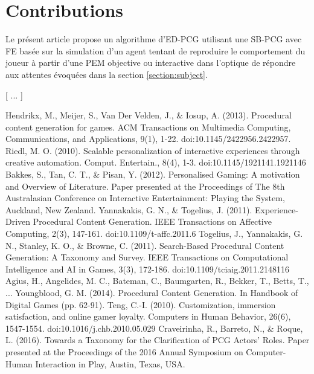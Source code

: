 \documentclass[a4paper,11pt]{article}
\begin{document}
    \section{Contributions}\label{section:contributions}
      
      Le présent article propose un algorithme d'ED-PCG utilisant une SB-PCG avec FE basée sur la simulation d'un agent tentant de reproduire le comportement du joueur à partir d'une PEM objective ou interactive dans l'optique de répondre aux attentes évoquées dans la section \ref{section:subject}.
      
      \vspace{2em}
      \centerline{[ ... ]}

    \begin{thebibliography}{99}
        Hendrikx, M., Meijer, S., Van Der Velden, J., \& Iosup, A. (2013). Procedural content generation for games. ACM Transactions on Multimedia Computing, Communications, and Applications, 9(1), 1-22. doi:10.1145/2422956.2422957.
        Riedl, M. O. (2010). Scalable personalization of interactive experiences through creative automation. Comput. Entertain., 8(4), 1-3. doi:10.1145/1921141.1921146
        Bakkes, S., Tan, C. T., \& Pisan, Y. (2012). Personalised Gaming: A motivation and Overview of Literature. Paper presented at the Proceedings of The 8th Australasian Conference on Interactive Entertainment: Playing the System, Auckland, New Zealand. 
        Yannakakis, G. N., \& Togelius, J. (2011). Experience-Driven Procedural Content Generation. IEEE Transactions on Affective Computing, 2(3), 147-161. doi:10.1109/t-affc.2011.6
        Togelius, J., Yannakakis, G. N., Stanley, K. O., \& Browne, C. (2011). Search-Based Procedural Content Generation: A Taxonomy and Survey. IEEE Transactions on Computational Intelligence and AI in Games, 3(3), 172-186. doi:10.1109/tciaig.2011.2148116     
        Agius, H., Angelides, M. C., Bateman, C., Baumgarten, R., Bekker, T., Betts, T., ... Youngblood, G. M. (2014). Procedural Content Generation. In Handbook of Digital Games (pp. 62-91). 
        Teng, C.-I. (2010). Customization, immersion satisfaction, and online gamer loyalty. Computers in Human Behavior, 26(6), 1547-1554. doi:10.1016/j.chb.2010.05.029
        Craveirinha, R., Barreto, N., \& Roque, L. (2016). Towards a Taxonomy for the Clarification of PCG Actors' Roles. Paper presented at the Proceedings of the 2016 Annual Symposium on Computer-Human Interaction in Play, Austin, Texas, USA. 

\end{thebibliography}
\end{document}
